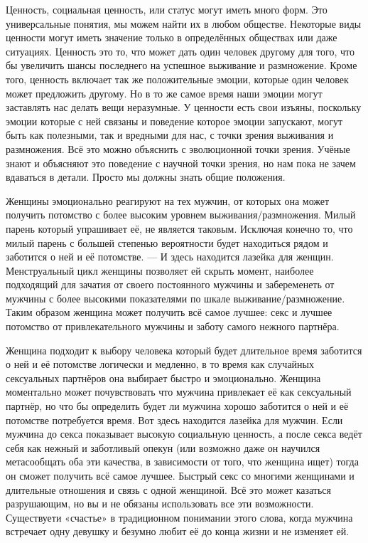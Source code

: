 Ценность, социальная ценность, или статус могут иметь много форм. Это универсальные понятия, мы можем найти их в любом обществе. Некоторые виды ценности могут иметь значение только в определённых обществах или даже ситуациях. Ценность это то, что может дать один человек другому для того, что бы увеличить шансы последнего на успешное выживание и размножение. Кроме того, ценность включает так же положительные эмоции, которые один человек может предложить другому. Но в то же самое время наши эмоции могут заставлять нас делать вещи неразумные. У ценности есть свои изъяны, поскольку эмоции которые с ней связаны и поведение которое эмоции запускают, могут быть как полезными, так и вредными для нас, с точки зрения выживания и размножения. Всё это можно объяснить с эволюционной точки зрения. Учёные знают и объясняют это поведение с научной точки зрения, но нам пока не зачем вдаваться в детали. Просто мы должны знать общие положения.

\RULE  Женщины эмоционально реагируют на тех мужчин, от которых она может получить потомство с более высоким уровнем выживания/размножения. Милый парень который упрашивает её, не является таковым. Исключая конечно то, что милый парень с большей степенью вероятности будет находиться рядом и заботится о ней и её потомстве. --- И здесь находится лазейка для женщин. Менструальный цикл женщины позволяет ей скрыть момент, наиболее подходящий для зачатия от своего постоянного мужчины и забеременеть от мужчины с более высокими показателями по шкале выживание/размножение. Таким образом женщина может получить всё самое лучшее: секс и лучшее потомство от привлекательного мужчины и заботу самого нежного партнёра.

\RULE  Женщина подходит к выбору человека который будет длительное время заботится о ней и её потомстве логически и медленно, в то время как случайных сексуальных партнёров она выбирает быстро и эмоционально. Женщина моментально может почувствовать что мужчина привлекает её как сексуальный партнёр, но что бы определить будет ли мужчина хорошо заботится о ней и её потомстве потребуется время. Вот здесь находится лазейка для мужчин. Если мужчина до секса показывает высокую социальную ценность, а после секса ведёт себя как нежный и заботливый опекун (или возможно даже он научился метасообщать оба эти качества, в зависимости от того, что женщина ищет) тогда он сможет получить всё самое лучшее. Быстрый секс со многими женщинами и длительные отношения и связь с одной женщиной. Всё это может казаться разрушающим, но вы и не обязаны использовать все эти возможности. Существуети «счастье» в традиционном понимании этого слова, когда мужчина встречает одну девушку и безумно любит её до конца жизни и не изменяет ей.

